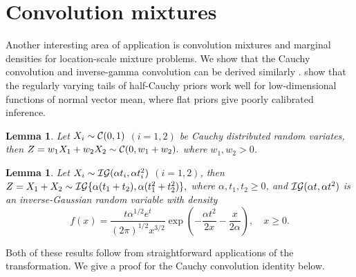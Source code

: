 \documentclass[11pt]{article}
\newtheorem{lemma}[theorem]{Lemma}
\begin{document}
\section{Convolution mixtures}
\label{sec:convolutions}

Another interesting area of application is convolution mixtures and marginal densities for location-scale mixture problems. We show that the Cauchy
convolution \citep{pillai2015unexpected} and inverse-gamma convolution can be derived similarly \citep{polson_halfcauchy_2012}. \citet{bhadra_default_2016} show that the regularly varying tails of half-Cauchy priors work well for low-dimensional functions of normal vector mean, where flat priors give poorly calibrated inference. 
\begin{lemma}
  Let $X_i \sim \mathcal{C}(0,1)$ $(i = 1, 2)$ be Cauchy distributed random variates, then $Z = w_1 X_1 + w_2 X_2 \sim \mathcal{C}( 0, w_1 + w_2).$ where $w_1,w_2 > 0$.
\end{lemma}
\begin{lemma}
  Let $X_i \sim \mathcal{IG}(\alpha t_i, \alpha t_i^2)$ $(i = 1, 2)$, then $Z = X_1 + X_2 \sim \mathcal{IG}\{\alpha (t_1 + t_2), \alpha (t_1^2+t_2^2)\},$ where $\alpha, t_1, t_2 \geq 0$, and $\mathcal{IG}(\alpha t, \alpha t^2)$ is an inverse-Gaussian random variable with density
\[
    f(x) = \frac{t \alpha^{1/2} e^t}{(2 \pi)^{1/2} x^{3/2}} 
    \exp\left( -\frac{\alpha t^2}{2x} - \frac{x}{2\alpha} \right), \quad x \geq 0.
\]
\end{lemma}

Both of these results follow from straightforward applications of the \CS{} 
transformation. We give a proof for the Cauchy convolution identity below.
\end{document}
